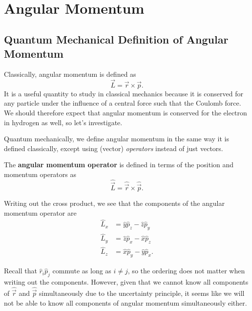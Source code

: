 \documentclass[../quantum_mechanics.tex]{subfiles}
\begin{document}
    \section{Angular Momentum}\label{sec:angular-momentum}
        \subsection{Quantum Mechanical Definition of Angular Momentum}\label{sec:angular-momentum:subsec:quantum-mechanical-definition}
            Classically, angular momentum is defined as
            \begin{equation}
                \vec{L}=\vec{r}\times\vec{p}.
            \end{equation}
            It is a useful quantity to study in classical mechanics because it is conserved for any particle under the influence of a central force such that the Coulomb force.
            We should therefore expect that angular momentum is conserved for the electron in hydrogen as well, so let's investigate.

            Quantum mechanically, we define angular momentum in the same way it is defined classically, except using (vector) \textit{operators} instead of just vectors.
            \begin{definition}
                The \textbf{angular momentum operator} is defined in terms of the position and momentum operators as
                \begin{equation}
                    \hat{\vec{L}}=\hat{\vec{r}}\times\hat{\vec{p}}.
                \end{equation}

                Writing out the cross product, we see that the components of the angular momentum operator are
                \begin{align}
                    \hat{L}_x&=\hat{y}\hat{p}_z-\hat{z}\hat{p}_y\\
                    \hat{L}_y&=\hat{z}\hat{p}_x-\hat{x}\hat{p}_z\\
                    \hat{L}_z&=\hat{x}\hat{p}_y-\hat{y}\hat{p}_x.
                \end{align}
            \end{definition}
            Recall that $\hat{r}_i\hat{p}_j$ commute as long as $i\neq j$, so the ordering does not matter when writing out the components.
            However, given that we cannot know all components of $\hat{\vec{r}}$ and $\hat{\vec{p}}$ simultaneously due to the uncertainty principle, it seems like we will not be able to know all components of angular momentum simultaneously either.
\end{document}
